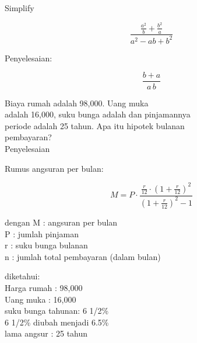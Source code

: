 \documentclass[a4paper,10pt]{article}
\begin{document}
\begin{eulernotebook}
\begin{eulercomment}
Simplify\\
\end{eulercomment}
\begin{eulerformula}
\[
\frac{\frac{a^2}{b}+\frac{b^2}{a}}{{a^2-ab+b^2}}
\]
\end{eulerformula}
\begin{eulercomment}
Penyelesaian:
\end{eulercomment}
\begin{eulerformula}
\[
\frac{b+a}{a\,b}
\]
\end{eulerformula}
\begin{eulercomment}
\end{eulercomment}
\begin{eulercomment}
Biaya rumah adalah \textdollar{}98,000. Uang muka\\
adalah \textdollar{}16,000, suku bunga adalah dan pinjamannya\\
periode adalah 25 tahun. Apa itu hipotek bulanan\\
pembayaran?\\
Penyelesaian

Rumus angsuran per bulan:\\
\end{eulercomment}
\begin{eulerformula}
\[
M = P \cdot \frac{\frac{r}{12} \cdot (1 +\frac{r}{12})^2}{(1 +\frac{r}{12})^2 - 1}
\]
\end{eulerformula}
\begin{eulercomment}
dengan M : angsuran per bulan\\
P : jumlah pinjaman\\
r : suku bunga bulanan\\
n : jumlah total pembayaran (dalam bulan)

diketahui:\\
Harga rumah : \textdollar{}98,000\\
Uang muka : \textdollar{}16,000\\
suku bunga tahunan: 6 1/2\%\\
6 1/2\% diubah menjadi 6.5\%\\
lama angsur : 25 tahun


\end{eulercomment}
\end{eulernotebook}
\end{document}
